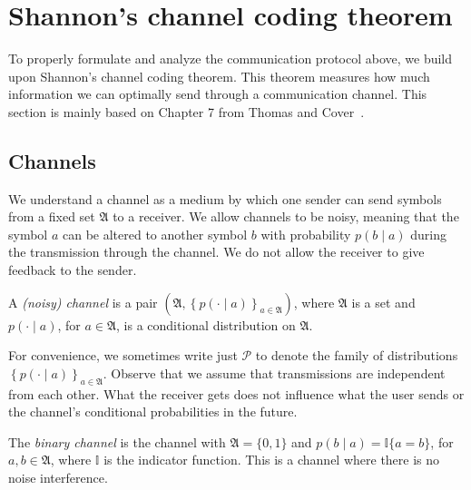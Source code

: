 \section{Shannon's channel coding theorem}

To properly formulate and analyze the communication protocol above, we build upon Shannon's channel coding theorem. This theorem measures how much information we can optimally send through a communication channel. This section is mainly based on Chapter 7 from Thomas and Cover~\cite{infotheory}.

\subsection{Channels}

We understand a channel as a medium by which one sender can send symbols from a fixed set $\mathfrak{A}$ to a receiver. We allow channels to be noisy, meaning that the symbol $a$ can be altered to another symbol $b$ with probability $p(b \mid a)$ during the transmission through the channel. We do not allow the receiver to give feedback to the sender.

\begin{definition} A \emph{(noisy) channel} is a pair $\left(\mathfrak{A}, \left\{p(\cdot \mid a)\right\}_{a \in \mathfrak{A}}\right)$, where $\mathfrak{A}$ is a set and $p(\cdot \mid a)$, for $a \in \mathfrak{A}$, is a conditional distribution on $\mathfrak{A}$.
\label{def:channel}
\end{definition}

For convenience, we sometimes write just $\mathcal{P}$ to denote the family of distributions $\left\{p(\cdot \mid a)\right\}_{a \in \mathfrak{A}}$. Observe that we assume that transmissions are independent from each other. What the receiver gets does not influence what the user sends or the channel's conditional probabilities in the future.
%

\begin{example}
The \emph{binary channel} is the channel with $\mathfrak{A} = \{0, 1\}$ and $p(b \mid a) = \mathbb{I}\{a=b\}$, for $a, b \in \mathfrak{A}$, where $\mathbb{I}$ is the indicator function. This is a channel where there is no noise interference.
\end{example}

